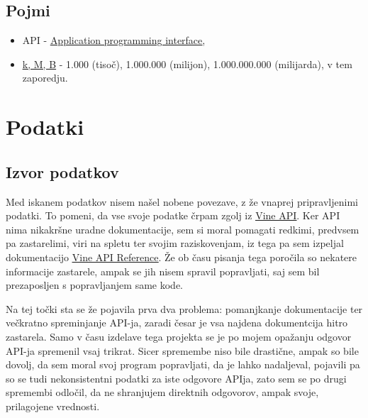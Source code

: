 \documentclass[a4paper,11pt]{article}
\begin{document}
\subsection{Pojmi}
\begin{itemize}
  \item API - \href{http://en.wikipedia.org/wiki/Application_programming_interface}{\underline{Application programming interface}},
  \item \href{http://sl.wikipedia.org/wiki/Predpone_SI}{\underline{k, M, B}} - 1.000 (tisoč), 1.000.000 (milijon), 1.000.000.000 (milijarda), v tem zaporedju.
\end{itemize}

\pagebreak
\section{Podatki}

\subsection{Izvor podatkov}

Med iskanem podatkov nisem našel nobene povezave, z že vnaprej pripravljenimi podatki. To pomeni, da vse svoje podatke črpam zgolj iz \href{https://api.vineapp.com}{\underline{Vine API}}. Ker API nima nikakršne uradne dokumentacije, sem si moral pomagati redkimi, predvsem pa zastarelimi, viri na spletu ter svojim raziskovenjam, iz tega pa sem izpeljal dokumentacijo \href{https://github.com/markogresak/vine-data-mining/blob/master/API-reference.md}{\underline{Vine API Reference}}. Že ob času pisanja tega poročila so nekatere informacije zastarele, ampak se jih nisem spravil popravljati, saj sem bil prezaposljen s popravljanjem same kode.
\par
Na tej točki sta se že pojavila prva dva problema: pomanjkanje dokumentacije ter večkratno spreminjanje API-ja, zaradi česar je vsa najdena dokumentcija hitro zastarela. Samo v času izdelave tega projekta se je po mojem opažanju odgovor API-ja spremenil vsaj trikrat. Sicer spremembe niso bile drastične, ampak so bile dovolj, da sem moral svoj program popravljati, da je lahko nadaljeval, pojavili pa so se tudi nekonsistentni podatki za iste odgovore APIja, zato sem se po drugi spremembi odločil, da ne shranjujem direktnih odgovorov, ampak svoje, prilagojene vrednosti.
\end{document}
